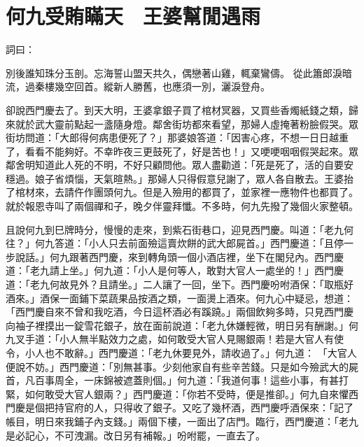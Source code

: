%

\chapter{何九受賄瞞天　王婆幫閒遇雨}

詞曰：

別後誰知珠分玉剖。忘海誓山盟天共久，偶戀著山雞，輒棄鸞儔。
從此簫郎淚暗流，過秦樓幾空回首。縱新人勝舊，也應須一別，灑淚登舟。

卻說西門慶去了。到天大明，王婆拿銀子買了棺材冥器，又買些香燭紙錢之類，歸來就於武大靈前點起一盞隨身燈。鄰舍街坊都來看望，那婦人虛掩著粉臉假哭。眾街坊問道：「大郎得何病患便死了？」那婆娘答道：「因害心疼，不想一日日越重了，看看不能夠好。不幸昨夜三更鼓死了，好是苦也！」又哽哽咽咽假哭起來。眾鄰舍明知道此人死的不明，不好只顧問他。眾人盡勸道：「死是死了，活的自要安穩過。娘子省煩惱，天氣暄熱。」那婦人只得假意兒謝了，眾人各自散去。王婆抬了棺材來，去請仵作團頭何九。但是入殮用的都買了，並家裡一應物件也都買了。就於報恩寺叫了兩個禪和子，晚夕伴靈拜懺。不多時，何九先撥了幾個火家整頓。

且說何九到巳牌時分，慢慢的走來，到紫石街巷口，迎見西門慶。叫道：「老九何往？」何九答道：「小人只去前面殮這賣炊餅的武大郎屍首。」西門慶道：「且停一步說話。」何九跟著西門慶，來到轉角頭一個小酒店裡，坐下在閣兒內。西門慶道：「老九請上坐。」何九道：「小人是何等人，敢對大官人一處坐的！」西門慶道：「老九何故見外？且請坐。」二人讓了一回，坐下。西門慶吩咐酒保：「取瓶好酒來。」酒保一面鋪下菜蔬果品按酒之類，一面燙上酒來。何九心中疑忌，想道：「西門慶自來不曾和我吃酒，今日這杯酒必有蹊蹺。」兩個飲夠多時，只見西門慶向袖子裡摸出一錠雪花銀子，放在面前說道：「老九休嫌輕微，明日另有酬謝。」何九叉手道：「小人無半點效力之處，如何敢受大官人見賜銀兩！若是大官人有使令，小人也不敢辭。」西門慶道：「老九休要見外，請收過了。」何九道： 「大官人便說不妨。」西門慶道：「別無甚事。少刻他家自有些辛苦錢。只是如今殮武大的屍首，凡百事周全，一床錦被遮蓋則個。」何九道：「我道何事！這些小事，有甚打緊，如何敢受大官人銀兩？」西門慶道：「你若不受時，便是推卻。」何九自來懼西門慶是個把持官府的人，只得收了銀子。又吃了幾杯酒，西門慶呼酒保來：「記了帳目，明日來我鋪子內支錢。」兩個下樓，一面出了店門。臨行，西門慶道：「老九是必記心，不可洩漏。改日另有補報。」吩咐罷，一直去了。

